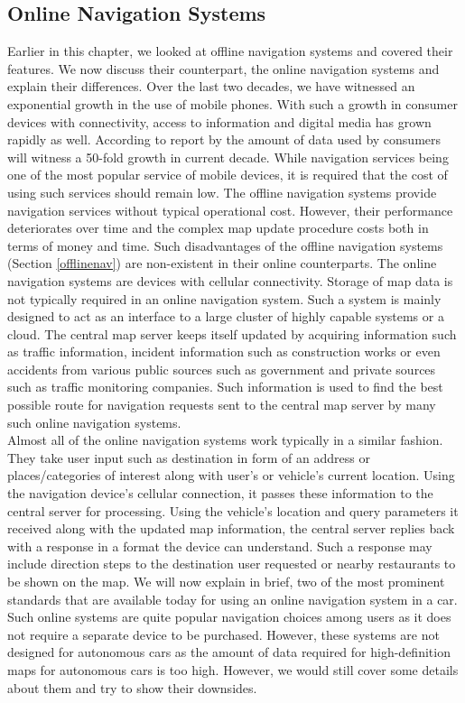 \subsection{Online Navigation Systems}
Earlier in this chapter, we looked at offline navigation systems and covered their features. We now discuss their counterpart, the online navigation systems and explain their differences. Over the last two decades, we have witnessed an exponential growth in the use of mobile phones. With such a growth in consumer devices with connectivity, access to information and digital media has grown rapidly as well. According to report by \citet{gantz2012digital} the amount of data used by consumers will witness a 50-fold growth in current decade. While navigation services being one of the most popular service of mobile devices, it is required that the cost of using such services should remain low. The offline navigation systems provide navigation services without typical operational cost. However, their performance deteriorates over time and the complex map update procedure costs both in terms of money and time. Such disadvantages of the offline navigation systems (Section \ref{offlinenav}) are non-existent in their online counterparts. The online navigation systems are devices with cellular connectivity. Storage of map data is not typically required in an online navigation system. Such a system is mainly designed to act as an interface to a large cluster of highly capable systems or a cloud. The central map server keeps itself updated by acquiring information such as traffic information, incident information such as construction works or even accidents from various public sources such as government and private sources such as traffic monitoring companies. Such information is used to find the best possible route for navigation requests sent to the central map server by many such online navigation systems. \\

Almost all of the online navigation systems work typically in a similar fashion. They take user input such as destination in form of an address or places/categories of interest along with user's or vehicle's current location. Using the navigation device's cellular connection, it passes these information to the central server for processing. Using the vehicle's location and query parameters it received along with the updated map information, the central server replies back with a response in a format the device can understand. Such a response may include direction steps to the destination user requested or nearby restaurants to be shown on the map. 
We will now explain in brief, two of the most prominent standards that are available today for using an online navigation system in a car. Such online systems are quite popular navigation choices among users as it does not require a separate device to be purchased. However, these systems are not designed for autonomous cars as the amount of data required for high-definition maps for autonomous cars is too high. However, we would still cover some details about them and try to show their downsides. 

